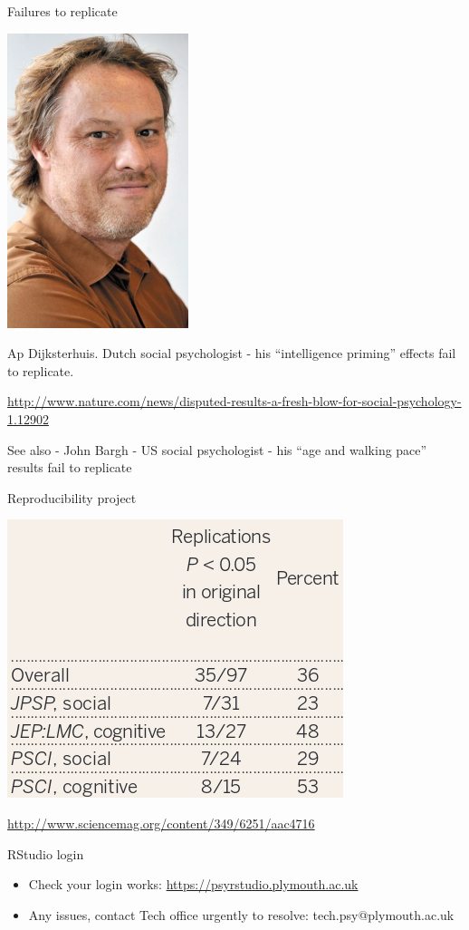 \documentclass{beamer}
\begin{document}
\begin{frame}{Failures to replicate}
	\centerline{\includegraphics[width=.2\textwidth]{pics/ap.jpg}}

	Ap Dijksterhuis. Dutch social psychologist - his ``intelligence priming'' effects fail to replicate. 
	
	\url{http://www.nature.com/news/disputed-results-a-fresh-blow-for-social-psychology-1.12902}
	
	See also - John Bargh - US social psychologist - his ``age and walking pace'' results fail to replicate
	
\end{frame}

\begin{frame}{Reproducibility project}
	\centerline{\includegraphics[width=.8\textwidth]{pics/nosek.png}}
	\url{http://www.sciencemag.org/content/349/6251/aac4716}
\end{frame}


\begin{frame}{RStudio login}
  \begin{itemize}
    \item Check your login works: \url{https://psyrstudio.plymouth.ac.uk}
    \item Any issues, contact Tech office urgently to resolve: tech.psy@plymouth.ac.uk
    \end{itemize}
\end{frame}
\end{document}
